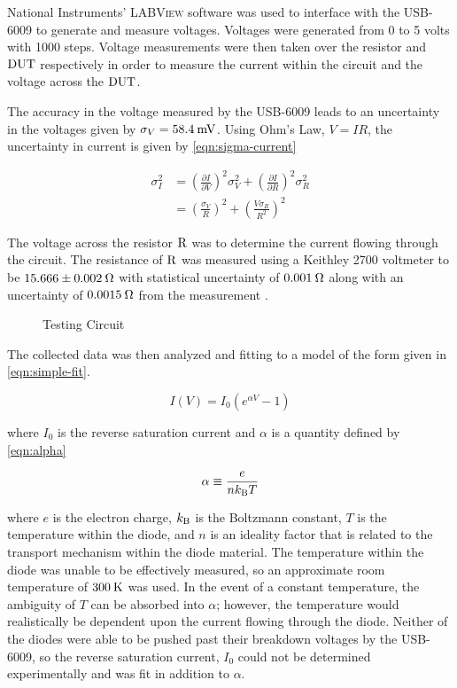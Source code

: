 \documentclass[reprint]{revtex4-1}
\begin{document}
National Instruments' \textsc{LABView} software was used to interface with the USB-6009 to generate and measure voltages. Voltages were generated from 0 to 5 volts with 1000 steps. Voltage measurements were then taken over the resistor and $\rm{DUT}$ respectively in order to measure the current within the circuit and the voltage across the $\rm{DUT}$.

The accuracy in the voltage measured by the USB-6009 leads to an uncertainty in the voltages given by $\sigma_V = 58.4\:\rm{mV}$. Using Ohm's Law, $V = IR$, the uncertainty in current is given by \cref{eqn:sigma-current}

\begin{equation} \label{eqn:sigma-current}
\begin{split}
\sigma_I^2 &= \left( \frac{\partial I}{\partial V} \right)^2 \sigma_V^2 + \left( \frac{\partial I}{\partial R} \right)^2 \sigma_R^2 \\
&= \left( \frac{\sigma_V}{R} \right)^2 + \left( \frac{ V \sigma_R }{R^2} \right)^2
\end{split}
\end{equation}

The voltage across the resistor $\rm{R}$ was to determine the current flowing through the circuit. The resistance of $\rm{R}$ was measured using a Keithley 2700 voltmeter to be $15.666 \pm 0.002\:\rm{\Omega}$ with statistical uncertainty of $0.001\:\rm{\Omega}$ along with an uncertainty of $0.0015\:\rm{\Omega}$ from the measurement \cite{Keithley2003}.

\begin{figure}


\caption{Testing Circuit}
\label{fig:circuit}
\end{figure}

The collected data was then analyzed and fitting to a model of the form given in \cref{eqn:simple-fit}.

\begin{equation}
I(V) = I_0 \left( e^{\alpha V} - 1 \right)
\label{eqn:simple-fit}
\end{equation}

where $I_0$ is the reverse saturation current and $\alpha$ is a quantity defined by \cref{eqn:alpha}

\begin{equation}
\alpha \equiv \frac{e}{n k_{\rm{B}} T}
\label{eqn:alpha}
\end{equation}

where $e$ is the electron charge, $k_{\rm{B}}$ is the Boltzmann constant, $T$ is the temperature within the diode, and $n$ is an ideality factor that is related to the transport mechanism within the diode material. The temperature within the diode was unable to be effectively measured, so an approximate room temperature of $300\:\rm{K}$ was used. In the event of a constant temperature, the ambiguity of $T$ can be absorbed into $\alpha$; however, the temperature would realistically be dependent upon the current flowing through the diode. Neither of the diodes were able to be pushed past their breakdown voltages by the USB-6009, so the reverse saturation current, $I_0$ could not be determined experimentally and was fit in addition to $\alpha$.
\end{document}
